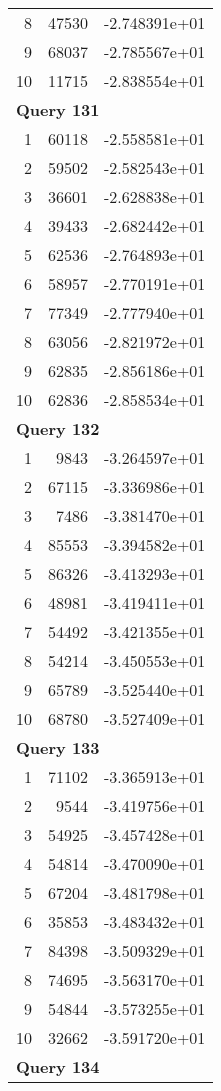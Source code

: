 \begin{longtable}[{p}]{@{}rrp{}@{}}
8 & 47530 & -2.748391e+01 \\
9 & 68037 & -2.785567e+01 \\
10 & 11715 & -2.838554e+01 \\
\midrule
\multicolumn{3}{l}{\bfseries Query 131} \\
1 & 60118 & -2.558581e+01 \\
2 & 59502 & -2.582543e+01 \\
3 & 36601 & -2.628838e+01 \\
4 & 39433 & -2.682442e+01 \\
5 & 62536 & -2.764893e+01 \\
6 & 58957 & -2.770191e+01 \\
7 & 77349 & -2.777940e+01 \\
8 & 63056 & -2.821972e+01 \\
9 & 62835 & -2.856186e+01 \\
10 & 62836 & -2.858534e+01 \\
\midrule
\multicolumn{3}{l}{\bfseries Query 132} \\
1 & 9843 & -3.264597e+01 \\
2 & 67115 & -3.336986e+01 \\
3 & 7486 & -3.381470e+01 \\
4 & 85553 & -3.394582e+01 \\
5 & 86326 & -3.413293e+01 \\
6 & 48981 & -3.419411e+01 \\
7 & 54492 & -3.421355e+01 \\
8 & 54214 & -3.450553e+01 \\
9 & 65789 & -3.525440e+01 \\
10 & 68780 & -3.527409e+01 \\
\midrule
\multicolumn{3}{l}{\bfseries Query 133} \\
1 & 71102 & -3.365913e+01 \\
2 & 9544 & -3.419756e+01 \\
3 & 54925 & -3.457428e+01 \\
4 & 54814 & -3.470090e+01 \\
5 & 67204 & -3.481798e+01 \\
6 & 35853 & -3.483432e+01 \\
7 & 84398 & -3.509329e+01 \\
8 & 74695 & -3.563170e+01 \\
9 & 54844 & -3.573255e+01 \\
10 & 32662 & -3.591720e+01 \\
\midrule
\multicolumn{3}{l}{\bfseries Query 134} \\

\end{longtable}
